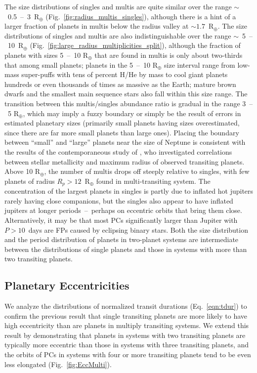 \documentclass{aastex62}
\begin{document}
The size distributions of singles and multis are quite similar over the range $\sim$~0.5~--~3~R$_\oplus$ (Fig.~\ref{fig:radius_multis_singles}), although there is a hint of a larger fraction of planets in multis below the radius valley at $
\sim 1.7$~R$_\oplus$. The size distributions of singles and multis are also indistinguishable over the range $\sim$~5~--~10~R$_\oplus$  (Fig.~\ref{fig:large_radius_multiplicities_split}), although the fraction of planets with sizes 5~--~10 R$_\oplus$ that are found in multis is only about two-thirds that among small planets; planets in the 5~--~10 R$_\oplus$ size interval range from low-mass super-puffs with tens of percent H/He by mass to cool giant planets hundreds or even thousands of times as massive as the Earth{; mature brown dwarfs and the smallest main sequence stars also fall within this size range}.  The transition between this multis/singles abundance ratio is gradual in the range 3~--~5 R$_\oplus$, which may imply a fuzzy boundary or simply be the result of errors in estimated planetary sizes (primarily small planets having sizes overestimated, since there are far more small planets than large ones). Placing the boundary between ``small'' and ``large'' planets near the size of Neptune is consistent with the results of the contemporaneous study of \cite{Ghezzi:2021}, who investigated correlations between stellar metallicity and maximum radius of observed transiting planets. Above 10 R$_\oplus$, the number of multis drops off steeply relative to singles, with few planets of radius $R_p > 12$~R$_\oplus$ found in multi-transiting system. The concentration of the largest planets in singles is partly due to inflated hot jupiters rarely having close companions, but the singles also appear to have inflated jupiters at longer periods~--~perhaps on eccentric orbits that bring them close.  Alternatively, it may be that most PCs significantly larger than Jupiter with $P>10$~days are FPs caused by eclipsing binary stars. Both the size distribution and the period distribution of planets in two-planet systems are intermediate between the distributions of single planets and those in systems with more than two transiting planets. 

\subsection{Planetary Eccentricities}
We analyze the distributions of normalized transit durations (Eq.~\ref{eqn:tdur}) to confirm the previous result that single transiting planets are more likely to have high eccentricity than are planets in multiply transiting systems. We extend this result by demonstrating that planets in systems with two transiting planets are typically more eccentric than those in systems with three transiting planets, and the orbits of PCs in systems with four or more transiting planets tend to be even less elongated (Fig.~\ref{fig:EccMulti}). 
\end{document}
